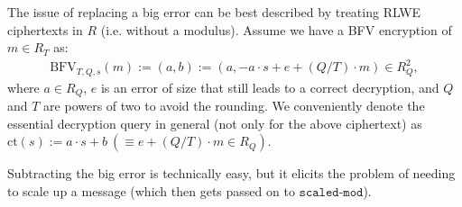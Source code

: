 \documentclass[letterpaper,10pt,english]{jupyterBook}
\begin{document}
\sphinxAtStartPar
The issue of replacing a big error can be best described by treating RLWE ciphertexts in \(R\) (i.e. without a modulus).
Assume we have a BFV encryption of \(m \in R_T\) as:
\begin{equation*}
\begin{split}\mathrm{BFV}_{T,Q,s}(m) := (a,b) := (a, -a\cdot s +e + (Q/T)\cdot m) \in R_Q^2,\end{split}
\end{equation*}
\sphinxAtStartPar
where \(a \in R_Q\), \(e\) is an error of size that still leads to a correct decryption, and \(Q\) and \(T\) are powers of two to avoid the rounding.
We conveniently denote the essential decryption query in general (not only for the above ciphertext) as \(\mathrm{ct}(s) := a\cdot s+b \ (\equiv e + (Q/T)\cdot m \in R_Q)\).

\sphinxAtStartPar
Subtracting the big error is technically easy, but it elicits the problem of needing to scale up a message (which then gets passed on to \(\texttt{scaled-mod}\)).
\end{document}
